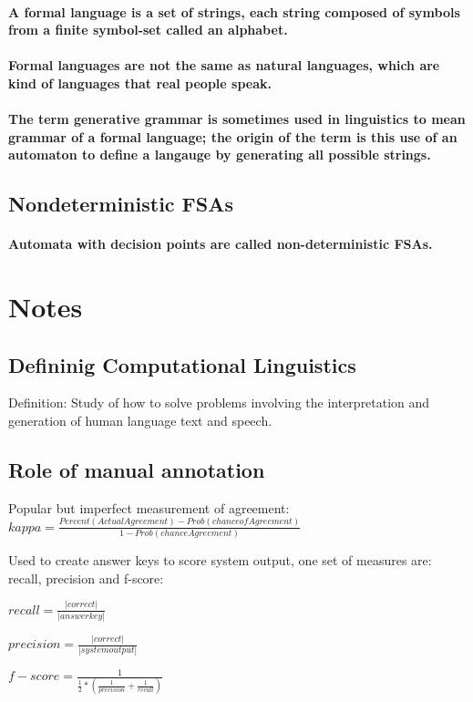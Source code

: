 \documentclass[a4paper]{article}
\begin{document}
\paragraph{A \textbf{formal language} is a set of strings, each string composed of symbols from a finite symbol-set called an \textbf{alphabet}. }
\paragraph{Formal languages are not the same as \textbf{natural languages}, which are kind of languages that real people speak. }
\paragraph{The term \textbf{generative grammar }is sometimes used in linguistics to mean grammar of a formal language; the origin of the term is this use of an automaton to define a langauge by generating all possible strings. }
\subsection{Nondeterministic FSAs}
\paragraph{Automata with decision points are called \textbf{non-deterministic FSAs}. }

\section{Notes}
\subsection{Defininig Computational Linguistics}
\par{Definition: Study of how to solve problems involving the interpretation and generation of human language text and speech.}
\subsection{Role of manual annotation}
\par{Popular but imperfect measurement of agreement: $kappa = \frac{Percent(Actual Agreement) - Prob(chance of Agreement)}{1-Prob(chance Agreement)}$}
\par{Used to create answer keys to score system output, one  set of measures are: recall, precision and f-score: }
\par{$recall = \frac{|correct|}{|answer key|}$}
\par{$precision = \frac{|correct|}{|system output|}$}
\par{$f-score = \frac{1}{\frac{1}{2} * ( \frac{1}{precision} + \frac{1}{recall}  ) }$}
\end{document}
